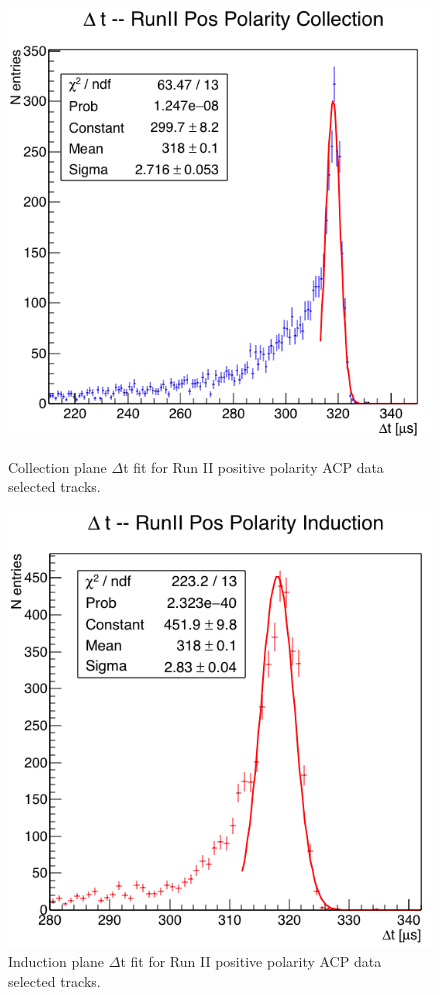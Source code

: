    
\begin{figure}[h!]
\begin{minipage}{0.40\textwidth}
\centering
\includegraphics[width=\textwidth]{AppendixB-EField/Images/RunIIPosCol.png}
\caption{Collection plane $\Delta$t fit for Run II positive polarity ACP data  selected tracks.}
\label{fig:Run2PosColFit}
\end{minipage}\hfill
\begin{minipage}{0.40\textwidth}
\centering
\includegraphics[width=\textwidth]{AppendixB-EField/Images/RunIIPosInd.png}
\caption{Induction plane $\Delta$t fit for Run II positive polarity ACP data  selected tracks.}
\label{fig:Run2PosIndFit}
\end{minipage}
\end{figure}

